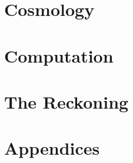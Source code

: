 \documentclass{article}
\begin{document}
\part{Cosmology}




\part{Computation}





\part{The Reckoning}






\appendix
\part{Appendices}




\nocite{*}


\end{document}
